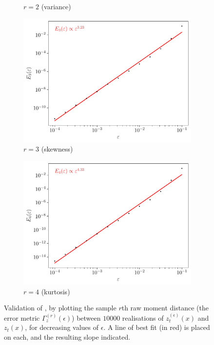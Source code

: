 \begin{figure}
\begin{center}
\begin{subfigure}{0.49\textwidth}
			\caption{\(r = 2\) (variance)}
			\label{fig:gamma_z_valid_2}
		\end{subfigure}
		\begin{subfigure}{0.49\textwidth}
			\includegraphics[width=\textwidth]{chp04_paper_numerics/figures/rossby/str_err_r_3.0.pdf}
			\caption{\(r = 3\) (skewness)}
			\label{fig:gamma_z_valid_3}
		\end{subfigure}
		\begin{subfigure}{0.49\textwidth}
			\includegraphics[width=\textwidth]{chp04_paper_numerics/figures/rossby/str_err_r_4.0.pdf}
			\caption{\(r = 4\) (kurtosis)}
			\label{fig:gamma_z_valid_4}
		\end{subfigure}

		\caption{Validation of , by plotting the sample \(r\)th raw moment distance (the error metric \(\Gamma_z^{(r)}(\epsilon)\)) between \(10000\) realisations of \(z_t^{(\epsilon)}(x)\) and \(z_t(x)\), for decreasing values of \(\epsilon\).
        A line of best fit (in red) is placed on each, and the resulting slope indicated.}
		\label{fig:gamma_z_valid}
	\end{center}
\end{figure}
